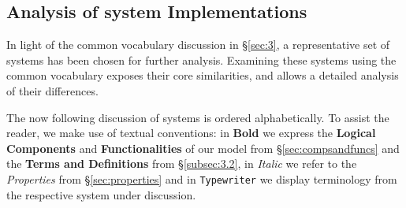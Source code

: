 \documentclass{sig-alternate}
\begin{document}
\subsection{Analysis of \pilot system Implementations}
\label{sec:implementations}

\newcommand{\vocab}[1]{\textbf{#1}\xspace}
\newcommand{\prop}[1]{\textit{#1}\xspace}
\newcommand{\impterm}[1]{\texttt{#1}\xspace}

In light of the common vocabulary discussion in \S\ref{sec:3}, a
representative set of \pilot systems has been chosen for further analysis.
Examining these \pilot systems using the common vocabulary exposes their core
similarities, and allows a detailed analysis of their differences.

The now following discussion of \pilot systems is ordered alphabetically.
To assist the reader, we make use of textual conventions: in \vocab{Bold} we
express the \vocab{Logical Components} and \vocab{Functionalities} of our model
from \S\ref{sec:compsandfuncs} and the \vocab{Terms and Definitions} from
\S\ref{subsec:3.2}, in \prop{Italic} we refer to the \prop{Properties} from
\S\ref{sec:properties} and in \impterm{Typewriter} we display terminology from
the respective \pilot system under discussion.

\end{document}
